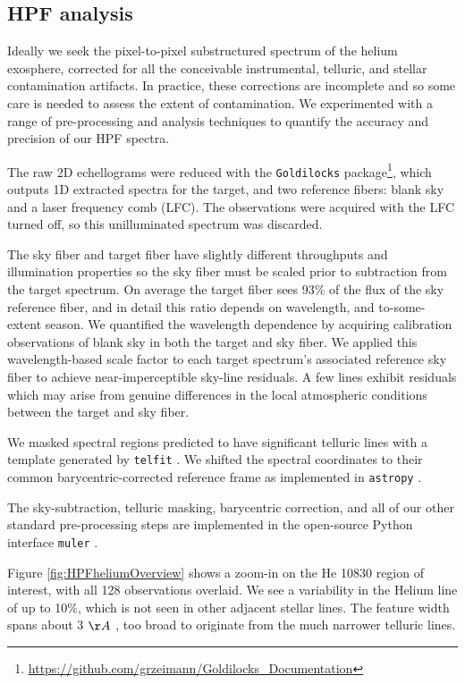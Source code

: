 \documentclass[twocolumn]{aastex631}
\begin{document}
\subsection{HPF analysis}
Ideally we seek the pixel-to-pixel substructured spectrum of the helium exosphere, corrected for all the conceivable instrumental, telluric, and stellar contamination artifacts.  In practice, these corrections are incomplete and so some care is needed to assess the extent of contamination.  We experimented with a range of pre-processing and analysis techniques to quantify the accuracy and precision of our HPF spectra.

The raw 2D echellograms were reduced with the \texttt{Goldilocks} package\footnote{\url{https://github.com/grzeimann/Goldilocks_Documentation}}, which outputs 1D extracted spectra for the target, and two reference fibers: blank sky and a laser frequency comb (LFC).  The observations were acquired with the LFC turned off, so this unilluminated spectrum was discarded.

The sky fiber and target fiber have slightly different throughputs and illumination properties so the sky fiber must be scaled prior to subtraction from the target spectrum.  On average the target fiber sees $93\%$ of the flux of the sky reference fiber, and in detail this ratio depends on wavelength, and to-some-extent season.  We quantified the wavelength dependence by acquiring calibration observations of blank sky in both the target and sky fiber.  We applied this wavelength-based scale factor to each target spectrum's associated reference sky fiber to achieve near-imperceptible sky-line residuals.  A few lines exhibit residuals which may arise from genuine differences in the local atmospheric conditions between the target and sky fiber.

We masked spectral regions predicted to have significant telluric lines with a template generated by \texttt{telfit} \citep{2014AJ....148...53G}.  We shifted the spectral coordinates to their common barycentric-corrected reference frame \citep{2014PASP..126..838W} as implemented in \texttt{astropy} \citep{2013A&A...558A..33A,2018AJ....156..123A}.

The sky-subtraction, telluric masking, barycentric correction, and all of our other standard pre-processing steps are implemented in the open-source Python interface \texttt{muler} \citep{2022JOSS....7.4302G}.

Figure \ref{fig:HPFheliumOverview} shows a zoom-in on the He 10830 region of interest, with all 128 observations overlaid.  We see a variability in the Helium line of up to 10\%, which is not seen in other adjacent stellar lines.  The feature width spans about 3 $\AA~$, too broad to originate from the much narrower telluric lines.
\end{document}
